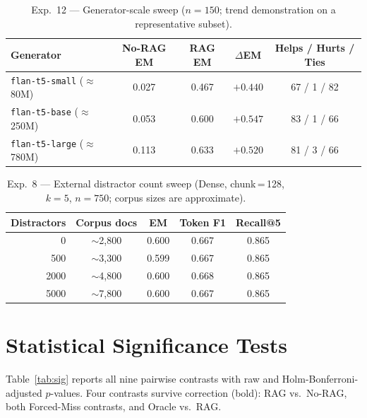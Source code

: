 \documentclass{article}
\begin{document}
\begin{table}[h]
\centering
\caption{Exp.~12 --- Generator-scale sweep ($n\!=\!150$; trend
  demonstration on a representative subset).}
\small
\begin{tabular}{lcccc}
\toprule
Generator & No-RAG EM & RAG EM & $\Delta$EM &
  Helps / Hurts / Ties \\
\midrule
\texttt{flan-t5-small} ($\approx$80M)  & 0.027 & 0.467 & $+0.440$ &
  67 / 1 / 82 \\
\texttt{flan-t5-base} ($\approx$250M)  & 0.053 & 0.600 & $+0.547$ &
  83 / 1 / 66 \\
\texttt{flan-t5-large} ($\approx$780M) & 0.113 & 0.633 & $+0.520$ &
  81 / 3 / 66 \\
\bottomrule
\end{tabular}
\end{table}

\begin{table}[h]
\centering
\caption{Exp.~8 --- External distractor count sweep (Dense, chunk\,=\,128,
  $k\!=\!5$, $n\!=\!750$; corpus sizes are approximate).}
\small
\begin{tabular}{rcccc}
\toprule
Distractors & Corpus docs & EM & Token F1 & Recall@5 \\
\midrule
0    & $\sim$2{,}800 & 0.600 & 0.667 & 0.865 \\
500  & $\sim$3{,}300 & 0.599 & 0.667 & 0.865 \\
2000 & $\sim$4{,}800 & 0.600 & 0.668 & 0.865 \\
5000 & $\sim$7{,}800 & 0.600 & 0.667 & 0.865 \\
\bottomrule
\end{tabular}
\end{table}

\section{Statistical Significance Tests}

Table~\ref{tab:sig} reports all nine pairwise contrasts with raw and
Holm-Bonferroni-adjusted $p$-values.
Four contrasts survive correction (bold):
RAG vs.\ No-RAG, both Forced-Miss contrasts, and Oracle vs.\ RAG.
\end{document}
